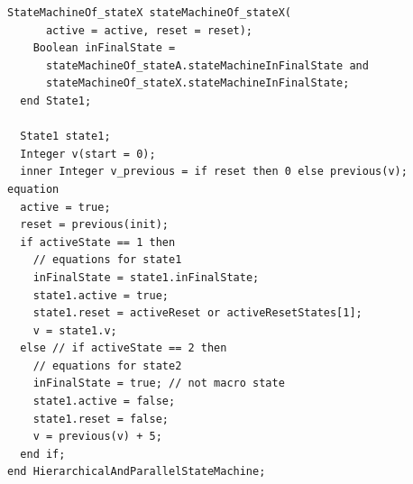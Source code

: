 \begin{example}
\begin{lstlisting}[language=modelica]
    StateMachineOf_stateX stateMachineOf_stateX(
      active = active, reset = reset);
    Boolean inFinalState =
      stateMachineOf_stateA.stateMachineInFinalState and
      stateMachineOf_stateX.stateMachineInFinalState;
  end State1;

  State1 state1;
  Integer v(start = 0);
  inner Integer v_previous = if reset then 0 else previous(v);
equation
  active = true;
  reset = previous(init);
  if activeState == 1 then
    // equations for state1
    inFinalState = state1.inFinalState;
    state1.active = true;
    state1.reset = activeReset or activeResetStates[1];
    v = state1.v;
  else // if activeState == 2 then
    // equations for state2
    inFinalState = true; // not macro state
    state1.active = false;
    state1.reset = false;
    v = previous(v) + 5;
  end if;
end HierarchicalAndParallelStateMachine;
\end{lstlisting}
\end{example}

